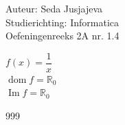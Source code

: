 \documentclass[a4paper]{article}
\begin{document}
\noindent \large Auteur: Seda Jusjajeva\\
\noindent \large Studierichting: Informatica\\
\noindent \large Oefeningenreeks 2A nr. 1.4 \\

\medskip

\normalsize


$f(x) = \dfrac{1}{x}$\\

$\operatorname{dom}f = \mathbb{R}_{0}$\\

$\operatorname{Im}f = \mathbb{R}_{0}$\\ 



\begin{thebibliography}{999}
\end{thebibliography}
\end{document}
